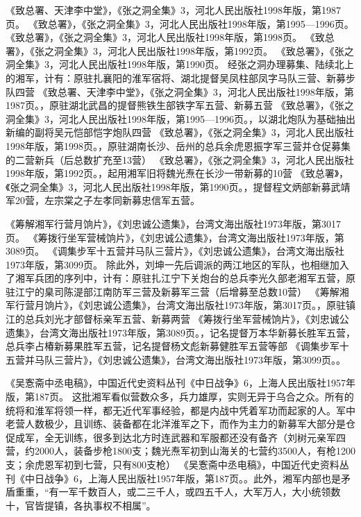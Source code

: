 \documentclass[12pt,UTF8]{ctexbook}
\begin{document}
《致总署、天津李中堂》，《张之洞全集》3，河北人民出版社1998年版，第1987页。
《致总署》，《张之洞全集》3，河北人民出版社1998年版，第1995—1996页。
《致总署》，《张之洞全集》3，河北人民出版社1998年版，第1998页。
《致总署》，《张之洞全集》3，河北人民出版社1998年版，第1992页。
《致总署》，《张之洞全集》3，河北人民出版社1998年版，第1990页。
经张之洞办理募集、陆续北上的湘军，计有：原驻扎襄阳的淮军宿将、湖北提督吴凤柱部凤字马队三营、新募步队四营 《致总署、天津李中堂》，《张之洞全集》3，河北人民出版社1998年版，第1987页。，原驻湖北武昌的提督熊铁生部铁字军五营、新募五营 《致总署》，《张之洞全集》3，河北人民出版社1998年版，第1995—1996页。，以湖北炮队为基础抽出新编的副将吴元恺部恺字炮队四营 《致总署》，《张之洞全集》3，河北人民出版社1998年版，第1998页。，原驻湖南长沙、岳州的总兵余虎恩振字军三营并仓促募集的二营新兵（后总数扩充至13营） 《致总署》，《张之洞全集》3，河北人民出版社1998年版，第1992页。，起用湘军旧将魏光焘在长沙一带新募的10营 《致总署》，《张之洞全集》3，河北人民出版社1998年版，第1990页。，提督程文炳部新募武靖军20营，左宗棠之子左孝同新募忠信军五营。

《筹解湘军行营月饷片》，《刘忠诚公遗集》，台湾文海出版社1973年版，第3017页。
《筹拨行坐军营械饷片》，《刘忠诚公遗集》，台湾文海出版社1973年版，第3089页。
《调集步军十五营并马队三营片》，《刘忠诚公遗集》，台湾文海出版社1973年版，第3099页。
除此外，刘坤一先后调派的两江地区的军队，也相继加入了湘军兵团的序列中，计有：原驻扎江宁下关炮台的总兵李光久部老湘军五营，原驻江宁的臬司陈湜部江南防军三营及新募军三营（后增募至总数10营） 《筹解湘军行营月饷片》，《刘忠诚公遗集》，台湾文海出版社1973年版，第3017页。，原驻镇江的总兵刘光才部督标亲军五营、新募两营 《筹拨行坐军营械饷片》，《刘忠诚公遗集》，台湾文海出版社1973年版，第3089页。，记名提督万本华新募长胜军五营，总兵李占椿新募果胜军五营，记名提督杨文彪新募健胜军五营等部 《调集步军十五营并马队三营片》，《刘忠诚公遗集》，台湾文海出版社1973年版，第3099页。。

《吴愙斋中丞电稿》，中国近代史资料丛刊《中日战争》6，上海人民出版社1957年版，第187页。
这批湘军看似营数众多，兵力雄厚，实则无异于乌合之众。所有的统将和淮军将领一样，都无近代军事经验，都是内战中凭着军功而起家的人。军中老营人数极少，且训练、装备都在北洋淮军之下，而作为主力的新募军大部分是仓促成军，全无训练，很多到达北方时连武器和军服都还没有备齐（刘树元亲军四营，约2000人，装备步枪1800支；魏光焘军初到山海关的七营约3500人，有枪1200支；余虎恩军初到七营，只有800支枪） 《吴愙斋中丞电稿》，中国近代史资料丛刊《中日战争》6，上海人民出版社1957年版，第187页。。此外，湘军内部也是矛盾重重，“有一军千数百人，或二三千人，或四五千人，大军万人，大小统领数十，官皆提镇，各执事权不相属”。
\end{document}
